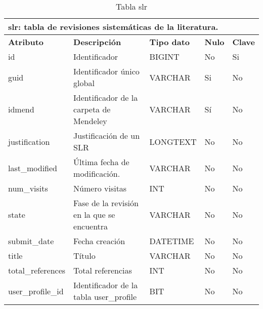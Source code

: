 \begin{table}[!hbt]
	\begin{center}
		\begin{tabular}{|p{3cm}|p{4cm}|p{4cm}|p{2cm}|p{2cm}|}
			\hline
			\multicolumn{5}{|l|}{\textbf{slr:} tabla de revisiones sistemáticas de la literatura.} \\
			\hline
			\hline
			\textbf{Atributo} & \textbf{Descripción} & \textbf{Tipo dato} & \textbf{Nulo} & \textbf{Clave}\\
			\hline
			id & Identificador  & BIGINT & No & Si\\
			\hline
			guid & Identificador único global  & VARCHAR & Si & No\\
			\hline
			idmend & Identificador de la carpeta de Mendeley  & VARCHAR & Sí & No\\
			\hline
			justification & Justificación de un SLR & LONGTEXT & No & No\\
			\hline
			last\_modified & Última fecha de modificación. & VARCHAR & No & No\\
			\hline
			num\_visits & Número visitas & INT & No & No\\
			\hline
			state & Fase de la revisión en la que se encuentra & VARCHAR & No & No\\
			\hline
			submit\_date & Fecha creación & DATETIME & No & No\\
			\hline
			title & Título & VARCHAR & No & No\\
			\hline
			total\_references & Total referencias & INT & No & No\\
			\hline
			user\_profile\_id & Identificador de la tabla user\_profile & BIT & No & No\\
			\hline
		\end{tabular}
		\caption{Tabla slr}
		\label{table:db-slr}
	\end{center}
\end{table}

